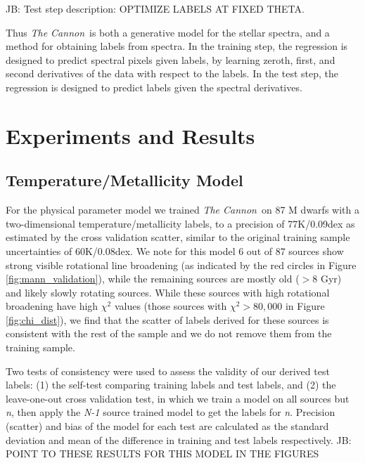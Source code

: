 \documentclass[modern]{aastex62}
\newcommand{\thecannon}{\textsl{The Cannon}}
\begin{document}
JB: Test step description: OPTIMIZE LABELS AT FIXED THETA.

Thus \thecannon\ is both a generative model for the stellar spectra, and a method for obtaining
labels from spectra. In the training step, the regression is designed to predict spectral pixels
given labels, by learning zeroth, first, and second derivatives of the data with respect to
the labels. In the test step, the regression is designed to predict labels given the spectral
derivatives.

\section{Experiments and Results} \label{sec:results}

\subsection{Temperature/Metallicity Model \label{subsec:mann_results}}
For the physical parameter model we trained \thecannon\ on 87 M dwarfs with a two-dimensional temperature/metallicity labels, to a precision of 77K/0.09dex as estimated by the cross validation scatter, similar to the original training sample uncertainties of 60K/0.08dex. We note for this model 6 out of 87 sources show strong visible rotational line broadening (as indicated by the red circles in Figure \ref{fig:mann_validation}), while the remaining sources are mostly old ($>8$ Gyr) and likely slowly rotating sources. While these sources with high rotational broadening have high $\chi^2$ values (those sources with $\chi^2 > 80,000$ in Figure \ref{fig:chi_dist}), we find that the scatter of labels derived for these sources is consistent with the rest of the sample and we do not remove them from the training sample.

Two tests of consistency were used to assess the validity of our derived test labels: (1) the self-test comparing training labels and test labels, and (2) the leave-one-out cross validation test, in which we train a model on all sources but \emph{n}, then apply the \emph{N-1} source trained model to get the labels for \emph{n}. Precision (scatter) and bias of the model for each test are calculated as the standard deviation and mean of the difference in training and test labels respectively. JB: POINT TO THESE RESULTS FOR THIS MODEL IN THE FIGURES
\end{document}
